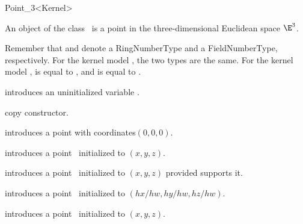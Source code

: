 \begin{ccRefClass} {Point_3<Kernel>}

\ccDefinition
An object of the class \ccRefName\ is a point in the three-dimensional
Euclidean space $\E^3$. 

Remember that  and  denote a
RingNumberType and a FieldNumberType, respectively. For the kernel
model , the two types are the same. For the
kernel model ,  is equal
to , and  is equal to
.

\ccTypes
{}
\ccThreeToTwo


\ccCreation
{}


\ccHidden {}
             {introduces an uninitialized variable \ccVar.}

\ccHidden {}
            {copy constructor.}

            {introduces a point with  coordinates$(0,0,0)$.}

            {introduces a point \ccVar\ initialized to $(x,y,z)$.}

            {introduces a point \ccVar\ initialized to $(x,y,z)$
             provided  supports it.}

            {introduces a point \ccVar\ initialized to $(hx/hw,hy/hw, hz/hw)$.
             }

            {introduces a point \ccVar\ initialized to $(x,y,z)$.}


\ccOperations


\end{ccRefClass}
